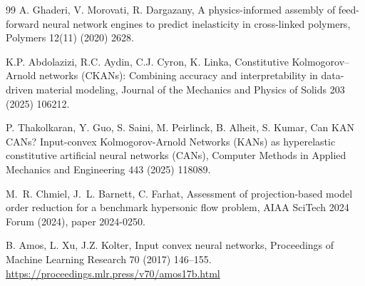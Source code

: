 \begin{thebibliography}{99}
A. Ghaderi, V. Morovati, R. Dargazany, A physics-informed assembly of
feed-forward neural network engines to predict inelasticity in
cross-linked polymers, Polymers 12(11) (2020) 2628.

K.P. Abdolazizi, R.C. Aydin, C.J. Cyron, K. Linka,
Constitutive Kolmogorov--Arnold networks (CKANs): Combining accuracy and interpretability in data-driven material modeling,
Journal of the Mechanics and Physics of Solids 203 (2025) 106212.

P. Thakolkaran, Y. Guo, S. Saini, M. Peirlinck, B. Alheit, S. Kumar, Can KAN CANs? Input-convex Kolmogorov-Arnold Networks (KANs) as hyperelastic constitutive artificial neural networks (CANs), Computer Methods in Applied Mechanics and Engineering 443 (2025) 118089. 

M.~R. Chmiel, J.~L. Barnett, C. Farhat, Assessment of
projection-based model order reduction for a benchmark hypersonic flow
problem, AIAA SciTech 2024 Forum (2024), paper 2024-0250.

B. Amos, L. Xu, J.Z. Kolter, Input convex neural networks, Proceedings of Machine Learning Research 70 (2017) 146--155. \url{https://proceedings.mlr.press/v70/amos17b.html}

\end{thebibliography}
